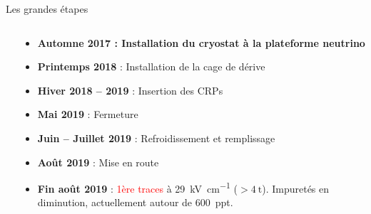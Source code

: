\begin{frame}{Les grandes étapes}
\begin{columns}
\begin{column}{0.4\textwidth}
            \end{column}\hfill
            \begin{column}{0.55\textwidth}
                \begin{itemize}
                    \item \textbf{Automne 2017 : Installation du cryostat à la plateforme neutrino}
                    \item\textbf{Printemps 2018} : Installation de la cage de dérive
                    \item \textbf{Hiver 2018 -- 2019} : Insertion des CRPs
                    \item \textbf{Mai 2019} : Fermeture
                    \item \textbf{Juin -- Juillet 2019} : Refroidissement et remplissage 
                    \item \textbf{Août 2019} : Mise en route
                    \item \textbf{Fin août 2019} : \textcolor{red}{1ère traces} à \SI{29}{\kilo\volt\per\centi\meter} ($>\SI{4}{\tonne}$). Impuretés en diminution, actuellement autour de \SI{600}{ppt}.
                \end{itemize}
            \end{column}
        \end{columns}
    \end{frame}
    
    {
       	\setlength\pdfpagewidth{12.8cm}%
       	\setlength\pdfpageheight{6.75cm}%
       \begin{frame}[plain]
             	
       \end{frame}
     }

